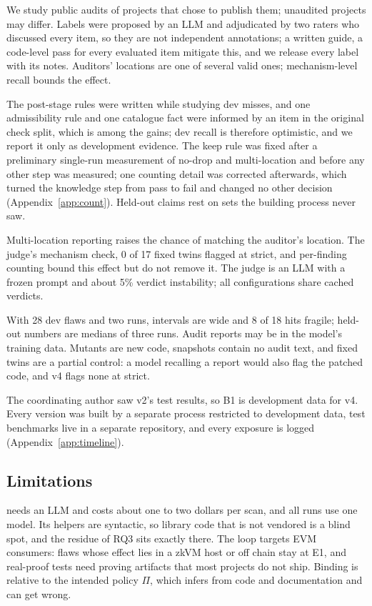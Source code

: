 We study public audits of projects that chose to publish them; unaudited
projects may differ. Labels were proposed by an LLM and adjudicated by two
raters who discussed every item, so they are not independent annotations; a
written guide, a code-level pass for every evaluated item  mitigate this, and we release every label with its
notes. Auditors' locations are one of several valid ones; mechanism-level
recall bounds the effect.

The post-stage rules were written while studying dev misses, and one
admissibility rule and one catalogue fact were informed by an item in the
original check split, which is among the gains; dev recall is therefore
optimistic, and we report it only as development evidence. The keep rule was
fixed after a preliminary single-run measurement of no-drop and
multi-location and before any other step was measured; one counting detail
was corrected afterwards, which turned the knowledge step from pass to fail
and changed no other decision (Appendix~\ref{app:count}). Held-out claims
rest on sets the building process never saw.

Multi-location reporting raises the chance of matching the auditor's
location. The judge's mechanism check, 0 of 17 fixed twins flagged at
strict, and per-finding counting bound this effect but do not remove it. The
judge is an LLM with a frozen prompt and about 5\% verdict instability; all
configurations share cached verdicts.

With 28 dev flaws and two runs, intervals are wide and 8 of 18 hits fragile;
held-out numbers are medians of three runs. Audit reports may be in the
model's training data. Mutants are new code, snapshots contain no audit text,
and fixed twins are a partial control: a model recalling a report would also
flag the patched code, and v4 flags none at strict. 

The coordinating author saw v2's test results, so B1 is development data for
v4. Every version was built by a separate process restricted to development
data, test benchmarks live in a separate repository, and every exposure is
logged (Appendix~\ref{app:timeline}).

\subsection{Limitations}\label{sec:limits}
\tool{} needs an LLM and costs about one to two dollars per scan, and all
runs use one model. Its helpers are syntactic, so library code that is not
vendored is a blind spot, and the residue of RQ3 sits exactly there. The
loop targets EVM consumers: flaws whose effect lies in a zkVM host or off
chain stay at E1, and real-proof tests need proving artifacts that most
projects do not ship. Binding is relative to the intended policy $\Pi$, which
\tool{} infers from code and documentation and can get wrong.
